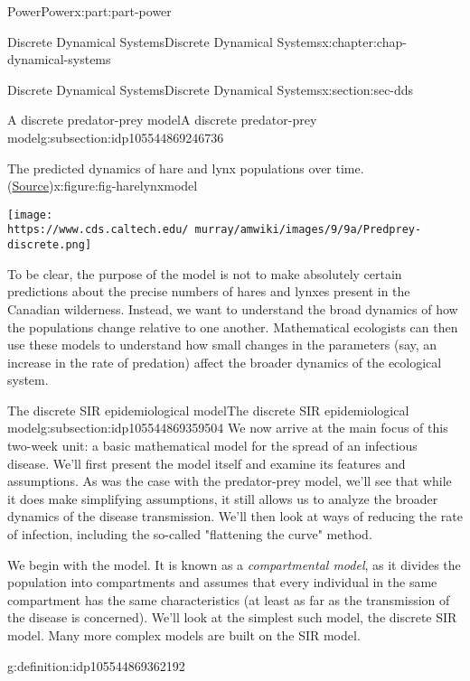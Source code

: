 \documentclass[oneside,10pt,]{book}
\numberwithin{equation}{section}
\begin{document}
\begin{partptx}{Power}{}{Power}{}{}{x:part:part-power}
\begin{chapterptx}{Discrete Dynamical Systems}{}{Discrete Dynamical Systems}{}{}{x:chapter:chap-dynamical-systems}
\begin{sectionptx}{Discrete Dynamical Systems}{}{Discrete Dynamical Systems}{}{}{x:section:sec-dds}
\begin{subsectionptx}{A discrete predator-prey model}{}{A discrete predator-prey model}{}{}{g:subsection:idp105544869246736}
\begin{figureptx}{The predicted dynamics of hare and lynx populations over time. (\href{https://www.cds.caltech.edu/\~murray/amwiki/index.php/Predator_prey}{Source}\protect\footnotemark{})}{x:figure:fig-harelynxmodel}{}
\begin{image}{0.25}{0.5}{0.25}
\texttt{[image: https://www.cds.caltech.edu/~murray/amwiki/images/9/9a/Predprey-discrete.png]}
\end{image}%
\tcblower
\end{figureptx}%
%
To be clear, the purpose of the model is not to make absolutely certain predictions about the precise numbers of hares and lynxes present in the Canadian wilderness. Instead, we want to understand the broad dynamics of how the populations change relative to one another. Mathematical ecologists can then use these models to understand how small changes in the parameters (say, an increase in the rate of predation) affect the broader dynamics of the ecological system.%
\end{subsectionptx}
%
%
\typeout{************************************************}
\typeout{************************************************}
%
\begin{subsectionptx}{The discrete SIR epidemiological model}{}{The discrete SIR epidemiological model}{}{}{g:subsection:idp105544869359504}
We now arrive at the main focus of this two-week unit: a basic mathematical model for the spread of an infectious disease. We'll first present the model itself and examine its features and assumptions. As was the case with the predator-prey model, we'll see that while it does make simplifying assumptions, it still allows us to analyze the broader dynamics of the disease transmission. We'll then look at ways of reducing the rate of infection, including the so-called "flattening the curve" method.%
\par
We begin with the model. It is known as a \emph{compartmental model}, as it divides the population into compartments and assumes that every individual in the same compartment has the same characteristics (at least as far as the transmission of the disease is concerned). We'll look at the simplest such model, the discrete SIR model. Many more complex models are built on the SIR model.%
\begin{definition}{}{g:definition:idp105544869362192}%

\end{definition}
\end{subsectionptx}
\end{sectionptx}
\end{chapterptx}
\end{partptx}
\end{document}
